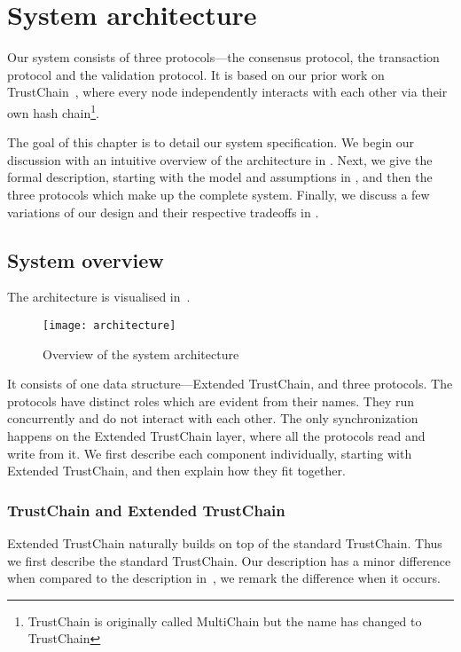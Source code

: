 \chapter{System architecture}
\label{ch:model}

Our system consists of three protocols---the consensus protocol, the transaction protocol and the validation protocol.
It is based on our prior work on TrustChain~\cite{multichain},
where every node independently interacts with each other via their own hash chain\footnote{TrustChain is originally called MultiChain but the name has changed to TrustChain}.

The goal of this chapter is to detail our system specification.
We begin our discussion with an intuitive overview of the architecture in .
Next, we give the formal description, starting with the model and assumptions in , 
and then the three protocols which make up the complete system.
Finally, we discuss a few variations of our design and their respective tradeoffs in .

\section{System overview}
\label{sec:system-overview}
The architecture is visualised in~.
\begin{figure}[h]
\centering
\texttt{[image: architecture]}
\caption{Overview of the system architecture}
\label{fig:architecture}
\end{figure}
It consists of one data structure---Extended TrustChain, and three protocols.
The protocols have distinct roles which are evident from their names.
They run concurrently and do not interact with each other.
The only synchronization happens on the Extended TrustChain layer, where all the protocols read and write from it.
We first describe each component individually, starting with Extended TrustChain, and then explain how they fit together.

\subsection*{TrustChain and Extended TrustChain}
Extended TrustChain naturally builds on top of the standard TrustChain. 
Thus we first describe the standard TrustChain.
Our description has a minor difference when compared to the description in~\cite{multichain},
we remark the difference when it occurs.


